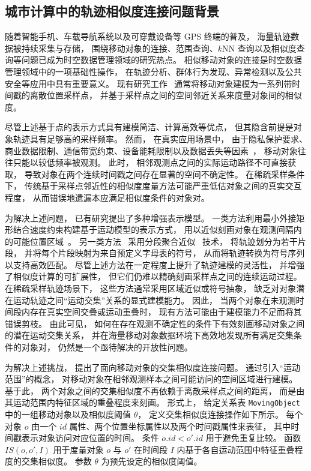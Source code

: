 \subsection{城市计算中的轨迹相似度连接问题背景}
随着智能手机、车载导航系统以及可穿戴设备等 GPS 终端的普及， 海量轨迹数据被持续采集与存储， 围绕移动对象的连接、范围查询、$k$NN 查询以及相似度查询等问题已成为时空数据管理领域的研究热点。
相似移动对象的连接是时空数据管理领域中的一项基础性操作， 在轨迹分析、群体行为发现、异常检测以及公共安全等应用中具有重要意义。 现有研究工作~ 通常将移动对象建模为一系列带时间戳的离散位置采样点， 并基于采样点之间的空间邻近关系来度量对象间的相似度。

尽管上述基于点的表示方式具有建模简洁、计算高效等优点， 但其隐含前提是对象轨迹具有足够高的采样频率。 然而， 在真实应用场景中， 由于隐私保护要求、商业数据限制、通信带宽约束、设备能耗限制以及数据丢失等因素~， 移动对象往往只能以较低频率被观测。 此时， 相邻观测点之间的实际运动路径不可直接获取， 导致对象在两个连续时间戳之间存在显著的空间不确定性。 在稀疏采样条件下， 传统基于采样点邻近性的相似度度量方法可能严重低估对象之间的真实交互程度， 从而错误地遗漏本应满足相似度条件的对象对。

为解决上述问题， 已有研究提出了多种增强表示模型。 一类方法利用最小外接矩形结合速度约束构建基于运动模型的表示方式， 用以近似刻画对象在观测间隔内的可能位置区域~。 另一类方法~ 采用分段聚合近似~ 技术， 将轨迹划分为若干片段， 并将每个片段映射为来自预定义字母表的符号， 从而将轨迹转换为符号序列以支持高效匹配。 尽管上述方法在一定程度上提升了轨迹建模的灵活性， 并增强了相似度计算的可扩展性， 但它们仍难以精确刻画采样点之间的连续运动过程。 在稀疏采样轨迹场景下， 这些方法通常采用区域近似或符号抽象， 缺乏对对象潜在运动轨迹之间“运动交集”关系的显式建模能力。 因此， 当两个对象在未观测时间段内存在真实空间交叠或运动重叠时， 现有方法可能由于建模能力不足而将其错误剪枝。 由此可见， 如何在存在观测不确定性的条件下有效刻画移动对象之间的潜在运动交集关系， 并在海量移动对象数据环境下高效地发现所有满足交集条件的对象对， 仍然是一个亟待解决的开放性问题。

为解决上述挑战， 提出了面向移动对象的交集相似度连接问题。 通过引入“运动范围”的概念， 对移动对象在相邻观测样本之间可能访问的空间区域进行建模。 基于此， 两个对象之间的交集相似度不再依赖于离散采样点之间的距离， 而是由其运动范围内特征区域的重叠程度来刻画。 形式上， 给定关系表 \texttt{MovingObject} 中的一组移动对象以及相似度阈值 $\theta$， 定义交集相似度连接操作如下所示。 每个对象 $o$ 由一个 $id$ 属性、两个位置坐标属性以及两个时间戳属性来表征， 其中时间戳表示对象访问对应位置的时间。 条件 $o.id<o'.id$ 用于避免重复比较。 函数 $IS(o,o',I)$ 用于度量对象 $o$ 与 $o'$ 在时间段 $I$ 内基于各自运动范围中特征重叠程度的交集相似度。 参数 $\theta$ 为预先设定的相似度阈值。

